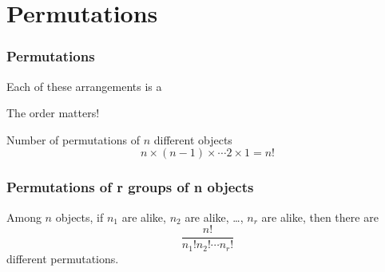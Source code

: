 \documentclass[slidestop,compress,mathserif]{beamer}
\begin{document}
\section{Permutations}
\begin{frame}[fragile]\frametitle{Permutations}


\begin{dinglist}{\DingListSymbolA}
\item Each of these arrangements is a 
\item The order matters!
\item Number of permutations of $n$ different objects
\[
n \times (n-1) \times \cdots 2 \times 1 = n!
\]
\end{dinglist}

\begin{comment}
Factorial in R:
\begin{verbatim}
factorial(3)
\end{verbatim}
\end{comment}

\end{frame}


\begin{frame}\frametitle{Permutations of r groups of n objects}
\begin{dinglist}{\DingListSymbolA}
\item Among $n$ objects, if $n_1$ are alike, $n_2$ are alike, \ldots, $n_r$ are alike, then there are
\[
\frac{n!}{n_1! n_2! \cdots n_r!}
\]
different permutations.
\end{dinglist}



\end{frame}
\end{document}
